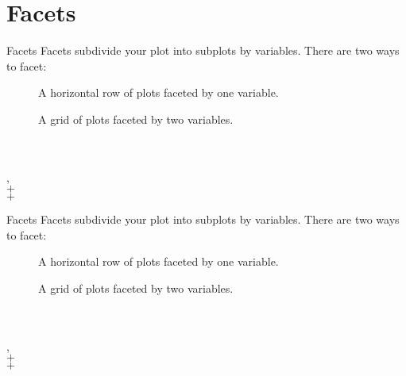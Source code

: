 \documentclass{beamer}
\begin{document}
\section{Facets}
\begin{frame}{Facets}
Facets subdivide your plot into subplots by variables. There are two ways to facet:
\begin{description}
\item[] A horizontal row of plots faceted by one variable.
\item[] A grid of plots faceted by two variables.
\end{description}

\begin{example}[wrap]
 \pipe  \\
\\
\quad {}, \\
\qquad \quad {} $+$ \\
  $+$ \\
\end{example}
\end{frame}
\begin{frame}{Facets}
Facets subdivide your plot into subplots by variables. There are two ways to facet:
\begin{description}
\item[] A horizontal row of plots faceted by one variable.
\item[] A grid of plots faceted by two variables.
\end{description}

\begin{example}[grid]
 \pipe  \\
\\
\quad {}, \\
\qquad \quad {} $+$ \\
  $+$ \\
\end{example}

\end{frame}
\end{document}
